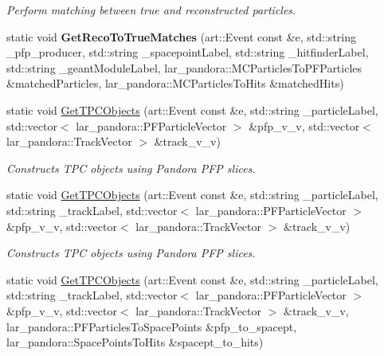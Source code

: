 \begin{DoxyCompactItemize}
\begin{DoxyCompactList}\small\item\em Perform matching between true and reconstructed particles. \end{DoxyCompactList}\item 
\hypertarget{classUBXSecHelper_a0bc1ff387b79732ea8d365ad296a22fb}{static void {\bfseries Get\-Reco\-To\-True\-Matches} (art\-::\-Event const \&e, std\-::string \-\_\-pfp\-\_\-producer, std\-::string \-\_\-spacepoint\-Label, std\-::string \-\_\-hitfinder\-Label, std\-::string \-\_\-geant\-Module\-Label, lar\-\_\-pandora\-::\-M\-C\-Particles\-To\-P\-F\-Particles \&matched\-Particles, lar\-\_\-pandora\-::\-M\-C\-Particles\-To\-Hits \&matched\-Hits)}\label{classUBXSecHelper_a0bc1ff387b79732ea8d365ad296a22fb}

\item 
static void \hyperlink{classUBXSecHelper_a36ef4a258300c98061cd01782157433b}{Get\-T\-P\-C\-Objects} (art\-::\-Event const \&e, std\-::string \-\_\-particle\-Label, std\-::vector$<$ lar\-\_\-pandora\-::\-P\-F\-Particle\-Vector $>$ \&pfp\-\_\-v\-\_\-v, std\-::vector$<$ lar\-\_\-pandora\-::\-Track\-Vector $>$ \&track\-\_\-v\-\_\-v)
\begin{DoxyCompactList}\small\item\em Constructs T\-P\-C objects using Pandora P\-F\-P slices. \end{DoxyCompactList}\item 
static void \hyperlink{classUBXSecHelper_a3cab5312a1b756505fe0fe1df779fdc4}{Get\-T\-P\-C\-Objects} (art\-::\-Event const \&e, std\-::string \-\_\-particle\-Label, std\-::string \-\_\-track\-Label, std\-::vector$<$ lar\-\_\-pandora\-::\-P\-F\-Particle\-Vector $>$ \&pfp\-\_\-v\-\_\-v, std\-::vector$<$ lar\-\_\-pandora\-::\-Track\-Vector $>$ \&track\-\_\-v\-\_\-v)
\begin{DoxyCompactList}\small\item\em Constructs T\-P\-C objects using Pandora P\-F\-P slices. \end{DoxyCompactList}\item 
static void \hyperlink{classUBXSecHelper_a2f4cbe3be1b4e4721d844c83258d6962}{Get\-T\-P\-C\-Objects} (art\-::\-Event const \&e, std\-::string \-\_\-particle\-Label, std\-::string \-\_\-track\-Label, std\-::vector$<$ lar\-\_\-pandora\-::\-P\-F\-Particle\-Vector $>$ \&pfp\-\_\-v\-\_\-v, std\-::vector$<$ lar\-\_\-pandora\-::\-Track\-Vector $>$ \&track\-\_\-v\-\_\-v, lar\-\_\-pandora\-::\-P\-F\-Particles\-To\-Space\-Points \&pfp\-\_\-to\-\_\-spacept, lar\-\_\-pandora\-::\-Space\-Points\-To\-Hits \&spacept\-\_\-to\-\_\-hits)

\end{DoxyCompactItemize}
